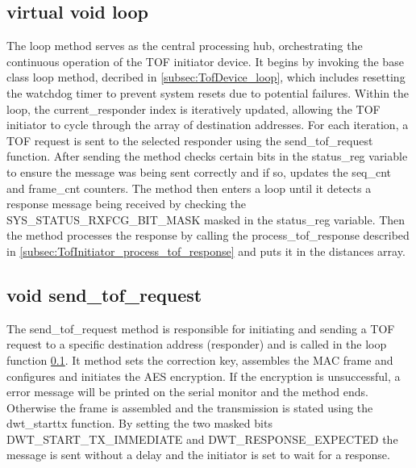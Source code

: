 \subsection{virtual void loop}
\label{subsec:TofInitiator_loop}
The loop method serves as the central processing hub, orchestrating the continuous operation of the TOF initiator device. 
It begins by invoking the base class loop method, decribed in \ref{subsec:TofDevice_loop}, which includes resetting the watchdog timer to prevent system resets due to potential failures. 
\vspace{4pt}
\newline
Within the loop, the current\_responder index is iteratively updated, allowing the TOF initiator to cycle through the array of destination addresses. 
For each iteration, a TOF request is sent to the selected responder using the send\_tof\_request function. 
After sending the method checks certain bits in the status\_reg variable to ensure the message was being sent correctly and if so, updates the seq\_cnt and frame\_cnt counters. 
\vspace{4pt}
\newline
The method then enters a loop until it detects a response message being received by checking the SYS\_STATUS\_RXFCG\_BIT\_MASK masked in the status\_reg variable. 
Then the method processes the response by calling the process\_tof\_response described in \ref{subsec:TofInitiator_process_tof_response} and puts it in the distances array. 

\subsection{void send\_tof\_request}
\label{subsec:TofInitiator_send_tof_request}
The send\_tof\_request method is responsible for initiating and sending a TOF request to a specific destination address (responder) and is called in the loop function \ref{subsec:TofInitiator_loop}. 
It method sets the correction key, assembles the MAC frame and configures and initiates the AES encryption. 
If the encryption is unsuccessful, a error message will be printed on the serial monitor and the method ends. 
Otherwise the frame is assembled and the transmission is stated using the dwt\_starttx function. 
By setting the two masked bits DWT\_START\_TX\_IMMEDIATE and DWT\_RESPONSE\_EXPECTED the message is sent without a delay and the initiator is set to wait for a response.  


